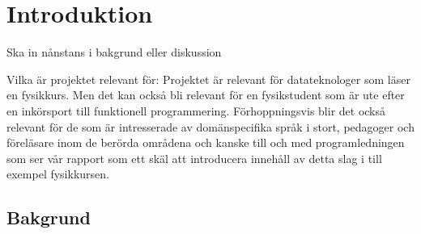 
\chapter{Introduktion}

\begin{binge}

Ska in nånstans i bakgrund eller diskussion

Vilka är projektet relevant för:
Projektet är relevant för datateknologer som läser en fysikkurs. Men det kan
också bli relevant för en fysikstudent som är ute efter en inkörsport till
funktionell programmering. Förhoppningsvis blir det också relevant för de som är
intresserade av domänspecifika språk i stort, pedagoger och föreläsare inom de
berörda områdena och kanske till och med programledningen som ser vår rapport
som ett skäl att introducera innehåll av detta slag i till exempel fysikkursen.

\end{binge}

\section{Bakgrund}

